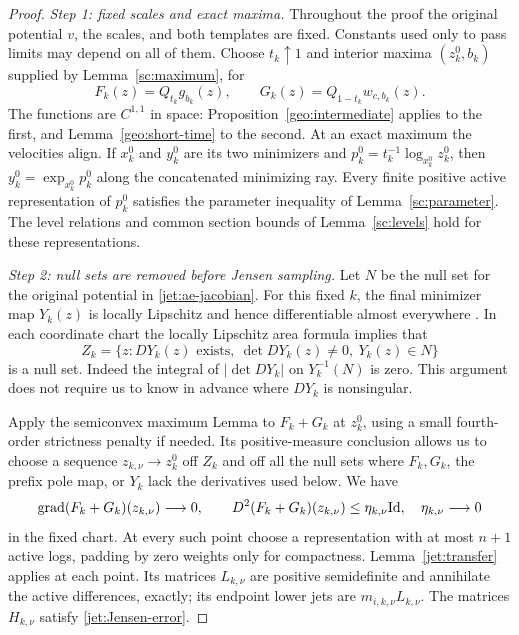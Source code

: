 \begin{proof}
\emph{Step 1: fixed scales and exact maxima.}
Throughout the proof the original potential $v$, the scales, and
both templates are fixed. Constants used only to pass limits may
depend on all of them. Choose $t_k\uparrow1$ and interior maxima
$(z_k^0,b_k)$ supplied by Lemma~\ref{sc:maximum}, for
\[
 F_k(z)=Q_{t_k}g_{b_k}(z),\qquad
 G_k(z)=Q_{1-t_k}w_{c,b_k}(z).
\]
The functions are $C^{1,1}$ in space:
Proposition~\ref{geo:intermediate} applies to the first, and
Lemma~\ref{geo:short-time} to the second. At an exact maximum the
velocities align. If $x_k^0$ and $y_k^0$ are its two minimizers
and $p_k^0=t_k^{-1}\log_{x_k^0}z_k^0$, then
$y_k^0=\exp_{x_k^0}p_k^0$ along the concatenated minimizing ray.
Every finite positive active representation of $p_k^0$ satisfies
the parameter inequality of Lemma~\ref{sc:parameter}. The level
relations and common section bounds of Lemma~\ref{sc:levels}
hold for these representations.

\emph{Step 2: null sets are removed before Jensen sampling.}
Let $N$ be the null set for the original potential in
\eqref{jet:ae-jacobian}. For this fixed $k$, the final minimizer
map $Y_k(z)$ is locally Lipschitz and hence differentiable
almost everywhere \cite[Chapter~2, Theorem~1.4]{Simon2018}.
In each coordinate chart the
locally Lipschitz area formula
\cite[Chapter~2, Theorem~3.3]{Simon2018} implies that
\begin{equation}\label{jet:null-preimage}
 Z_k=\{z:DY_k(z)\text{ exists},\ \det DY_k(z)\ne0,\
                     Y_k(z)\in N\}
\end{equation}
is a null set. Indeed the integral of $|\det DY_k|$ on
$Y_k^{-1}(N)$ is zero. This argument does not require us to know
in advance where $DY_k$ is nonsingular.

Apply the semiconvex maximum Lemma
\cite[Appendix, Lemmas~A.3--A.4]{CIL1992} to $F_k+G_k$ at
$z_k^0$, using a small fourth-order strictness penalty if needed.
Its positive-measure conclusion allows us to choose a sequence
$z_{k,\nu}\to z_k^0$ off $Z_k$ and off all the null sets where
$F_k,G_k$, the prefix pole map, or $Y_k$ lack the derivatives
used below. We have
\begin{equation}\label{jet:Jensen-sequence}
 \operatorname{grad}(F_k+G_k)(z_{k,\nu})\longrightarrow0,\qquad
 D^2(F_k+G_k)(z_{k,\nu})\le \eta_{k,\nu}\mathrm{Id},\quad
 \eta_{k,\nu}\longrightarrow0
\end{equation}
in the fixed chart.
At every such point choose a representation with at most $n+1$
active logs, padding by zero weights only for compactness.
Lemma~\ref{jet:transfer} applies at each point. Its matrices
$L_{k,\nu}$ are positive semidefinite and annihilate the active
differences, exactly; its endpoint lower jets are $m_{i,k,\nu}
L_{k,\nu}$. The matrices $H_{k,\nu}$ satisfy
\eqref{jet:Jensen-error}.


\end{proof}
